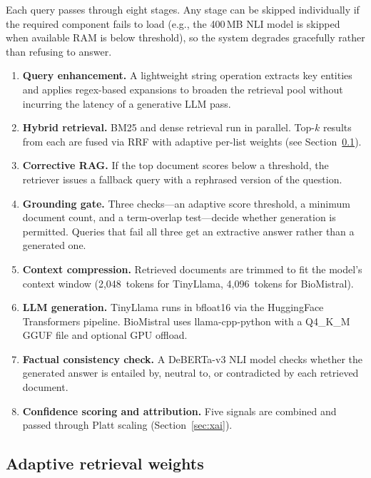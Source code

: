 \documentclass[conference,a4paper]{IEEEtran}
\begin{document}
Each query passes through eight stages. Any stage can be skipped
individually if the required component fails to load (e.g., the 400\,MB
NLI model is skipped when available RAM is below threshold), so the
system degrades gracefully rather than refusing to answer.

\begin{enumerate}[noitemsep,topsep=2pt]
  \item \textbf{Query enhancement.} A lightweight string operation extracts key entities
        and applies regex-based expansions to broaden the retrieval pool without incurring
        the latency of a generative LLM pass.
  \item \textbf{Hybrid retrieval.} BM25 and dense retrieval run in
        parallel. Top-$k$ results from each are fused via RRF with
        adaptive per-list weights (see Section~\ref{sec:adaptive}).
  \item \textbf{Corrective RAG.} If the top document scores below a
        threshold, the retriever issues a fallback query with a rephrased
        version of the question.
  \item \textbf{Grounding gate.} Three checks---an adaptive score
        threshold, a minimum document count, and a term-overlap
        test---decide whether generation is permitted. Queries that
        fail all three get an extractive answer rather than a generated one.
  \item \textbf{Context compression.} Retrieved documents are trimmed
        to fit the model's context window (2,048~tokens for TinyLlama,
        4,096~tokens for BioMistral).
  \item \textbf{LLM generation.} TinyLlama runs in bfloat16 via the
        HuggingFace Transformers pipeline. BioMistral uses llama-cpp-python
        with a Q4\_K\_M GGUF file and optional GPU offload.
  \item \textbf{Factual consistency check.} A DeBERTa-v3 NLI model
        checks whether the generated answer is entailed by, neutral to,
        or contradicted by each retrieved document.
  \item \textbf{Confidence scoring and attribution.} Five signals are
        combined and passed through Platt scaling
        (Section~\ref{sec:xai}).
\end{enumerate}

\subsection{Adaptive retrieval weights}
\label{sec:adaptive}
\end{document}
